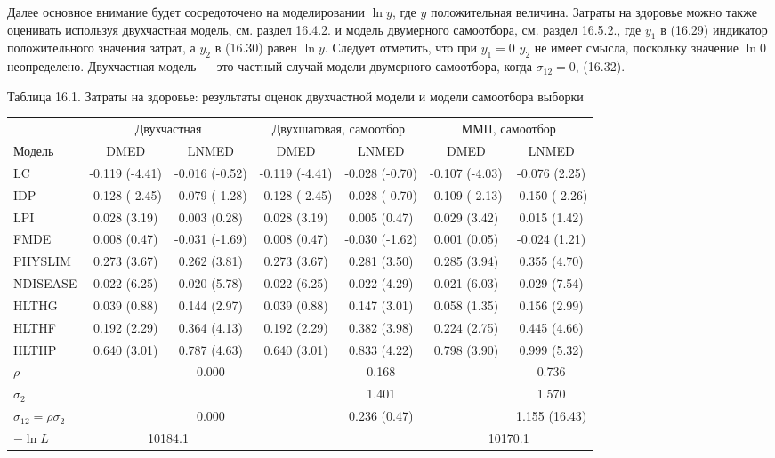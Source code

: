 Далее основное внимание будет сосредоточено на моделировании $\ln{ y}$, где $y$ положительная величина. Затраты на здоровье можно также оценивать используя двухчастная модель, см. раздел 16.4.2. и модель двумерного самоотбора, см. раздел 16.5.2., где $y_1$ в (16.29) индикатор положительного значения затрат, а $y_2$ в (16.30) равен $\ln{ y}$. Следует отметить, что при $y_1=0$ $y_2$ не имеет смысла, поскольку значение $\ln{ 0}$ неопределено. Двухчастная модель  --- это частный случай модели двумерного самоотбора, когда $\sigma_{12}=0$, (16.32).

Таблица 16.1. Затраты на здоровье: результаты оценок двухчастной модели и модели самоотбора выборки

\begin{tabular}{lcccccc}
\hline
& \multicolumn{2}{c}{Двухчастная} & \multicolumn{2}{c}{Двухшаговая, самоотбор} & \multicolumn{2}{c}{ММП, самоотбор} \\
Модель & DMED & LNMED & DMED & LNMED & DMED & LNMED \\
\hline
LC & -0.119 (-4.41) & -0.016 (-0.52) & -0.119 (-4.41) &   -0.028 (-0.70)  & -0.107 (-4.03) & -0.076 (2.25) \\
IDP & -0.128 (-2.45) & -0.079 (-1.28) & -0.128 (-2.45) & -0.028 (-0.70) &  -0.109 (-2.13) & -0.150 (-2.26) \\
LPI & 0.028 (3.19)  &  0.003 (0.28)  &  0.028 (3.19)  & 0.005 (0.47)  & 0.029 (3.42)  & 0.015 (1.42) \\
FMDE & 0.008 (0.47)  &  -0.031 (-1.69) &   0.008 (0.47)  & -0.030 (-1.62) &  0.001 (0.05) & -0.024 (1.21) \\
PHYSLIM & 0.273 (3.67)  &  0.262 (3.81)  &  0.273 (3.67)  &  0.281 (3.50) & 0.285  (3.94) & 0.355 (4.70) \\
NDISEASE  & 0.022 (6.25)  &  0.020 (5.78)  &  0.022 (6.25)  & 0.022 (4.29) & 0.021  (6.03) & 0.029 (7.54) \\
HLTHG &  0.039 (0.88)  &  0.144 (2.97)  &  0.039 (0.88)  &  0.147 (3.01) & 0.058  (1.35) & 0.156 (2.99) \\
HLTHF & 0.192 (2.29)  &  0.364 (4.13)  &  0.192 (2.29)   &   0.382 (3.98) & 0.224  (2.75) & 0.445 (4.66) \\
HLTHP & 0.640 (3.01)  &  0.787 (4.63)  &  0.640 (3.01)   &   0.833 (4.22) & 0.798  (3.90) & 0.999 (5.32) \\
$\rho$ & & 0.000 & & 0.168 & & 0.736 \\
$\sigma_2$ & &  & & 1.401 & & 1.570 \\
$\sigma_{12}=\rho \sigma_2$ & & 0.000 & & 0.236 (0.47) & & 1.155 (16.43) \\
$-\ln L$ & \multicolumn{2}{c}{10184.1} & & & \multicolumn{2}{c}{10170.1} \\
\hline
\end{tabular}

